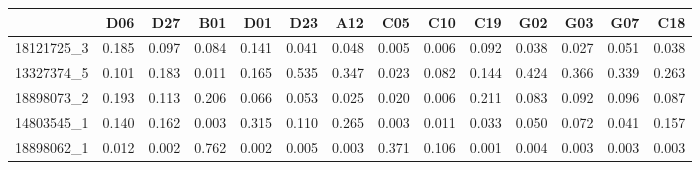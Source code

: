 \begin{tabular}{lrrrrrrrrrrrrr}
\toprule
{} &    D06 &    D27 &    B01 &    D01 &    D23 &    A12 &    C05 &    C10 &    C19 &    G02 &    G03 &    G07 &    C18 \\
\midrule
18121725\_3 &  0.185 &  0.097 &  0.084 &  0.141 &  0.041 &  0.048 &  0.005 &  0.006 &  0.092 &  0.038 &  0.027 &  0.051 &  0.038 \\
13327374\_5 &  0.101 &  0.183 &  0.011 &  0.165 &  0.535 &  0.347 &  0.023 &  0.082 &  0.144 &  0.424 &  0.366 &  0.339 &  0.263 \\
18898073\_2 &  0.193 &  0.113 &  0.206 &  0.066 &  0.053 &  0.025 &  0.020 &  0.006 &  0.211 &  0.083 &  0.092 &  0.096 &  0.087 \\
14803545\_1 &  0.140 &  0.162 &  0.003 &  0.315 &  0.110 &  0.265 &  0.003 &  0.011 &  0.033 &  0.050 &  0.072 &  0.041 &  0.157 \\
18898062\_1 &  0.012 &  0.002 &  0.762 &  0.002 &  0.005 &  0.003 &  0.371 &  0.106 &  0.001 &  0.004 &  0.003 &  0.003 &  0.003 \\
\bottomrule
\end{tabular}
